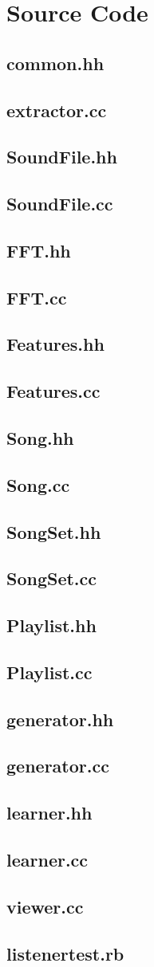 \pagebreak
\marginsize{1cm}{1cm}{1cm}{2cm}
\chapter{Source Code}

\newcommand{\inputcode}[1]{
\section{#1}
\label{code:#1}
\small

}

\inputcode{common.hh}
\inputcode{extractor.cc}
\inputcode{SoundFile.hh}
\inputcode{SoundFile.cc}
\inputcode{FFT.hh}
\inputcode{FFT.cc}
\inputcode{Features.hh}
\inputcode{Features.cc}
\inputcode{Song.hh}
\inputcode{Song.cc}
\inputcode{SongSet.hh}
\inputcode{SongSet.cc}
\inputcode{Playlist.hh}
\inputcode{Playlist.cc}
\inputcode{generator.hh}
\inputcode{generator.cc}
\inputcode{learner.hh}
\inputcode{learner.cc}
\inputcode{viewer.cc}
\inputcode{listenertest.rb}
